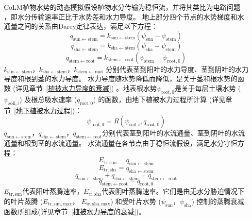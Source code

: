CoLM植物水势的动态模拟假设植物水分传输为稳恒流，并将其类比为电路问题~
\citep{van1948water}，即水分传输速率正比于水势差和水力导度。
地上部分四个节点的水势梯度和水通量之间的关系由Darcy定律表达，满足以下方程：
\begin{equation}\label{q_sunstem}
  q_{\mathrm{ {sun \leftarrow stem }}}=k_{\mathrm{{sun} \leftarrow  {stem}}}\left(\psi_{\mathrm{sun}}-\psi_{\mathrm{stem}}\right)
\end{equation}
\begin{equation}
  q_{\mathrm{ {sha \leftarrow stem }}}=k_{\mathrm{ {sha} \leftarrow {stem}}}\left(\psi_{\mathrm{sha}}-\psi_{\mathrm{ {stem }}}\right)
\end{equation}
\begin{equation}
  q_{\mathrm{ {stem \leftarrow root }}}=k_{\mathrm{ {stem } \leftarrow  { root }}}\left(\psi_{\mathrm{ {stem }}}-\psi_{\mathrm{ {root }}, 0}\right)
\end{equation}
$k_{\mathrm{sun \leftarrow stem}}$，$k_{\mathrm{sha \leftarrow stem }}$，$k_{\mathrm{stem \leftarrow root }}$ 分别代表茎到阳叶的水力导度、茎到阴叶的水力导度和根到茎的水力导度。
水力导度随水势降低而降低，是关于茎和根水势的函数 (详见章节~\ref{植被水力导度的衰减}) 。地表根水势$\psi_{\mathrm{root,0}}$是关于每层土壤水势 ($\psi_{\mathrm{soil},i}$)
及根总吸水速率 ($q_{\mathrm{root,0}}$) 的函数，由地下植被水力过程所计算 (详见章节~\ref{地下植被水力过程})：
\begin{equation}\label{Psi_root_0}
  \psi_{\mathrm{root, 0}}=R\left(\psi_{\mathrm{ {soil }}, i}, q_{\mathrm{root, 0}}\right)
\end{equation}
$q_{\mathrm{sun \leftarrow stem}}$，$q_{\mathrm{sha \leftarrow stem }}$，$q_{\mathrm{stem \leftarrow root }}$分别代表茎到阳叶的水流通量、茎到阴叶的水流通量和根到茎的水流通量。
水流通量在各节点由于稳恒流假设，满足水分守恒方程：
\begin{equation}
  E_{\mathrm{tr,sun}}=q_{\mathrm{sun \leftarrow  stem}}
\end{equation}
\begin{equation}
  E_{\mathrm{tr, {sha }}}=q_{\mathrm{ sha \leftarrow stem}}
\end{equation}
\begin{equation}
  q_{\mathrm{ {sun \leftarrow stem }}}+q_{\mathrm{ {sha \leftarrow stem }}}=q_{\mathrm{ {stem \leftarrow root }}}
\end{equation}
\begin{equation}\label{q_stemroot}
  q_{\mathrm{stem \leftarrow root}}=q_{\mathrm{root, 0}}
\end{equation}
$E_{\mathrm{tr,sun}}$代表阳叶蒸腾速率，$E_{\mathrm{tr,sha}}$代表阴叶蒸腾速率。它们是由无水分胁迫情况下的叶片蒸腾 ($E_{\mathrm{tr,sun,max}}$， $E_{\mathrm{tr,sha,max}}$)
和受叶片水势 ($\psi_{\mathrm{sun}}$，$\psi_{\mathrm{sha}}$) 控制的蒸腾衰减函数所组成(详见章节~\ref{植被水力导度的衰减})。


